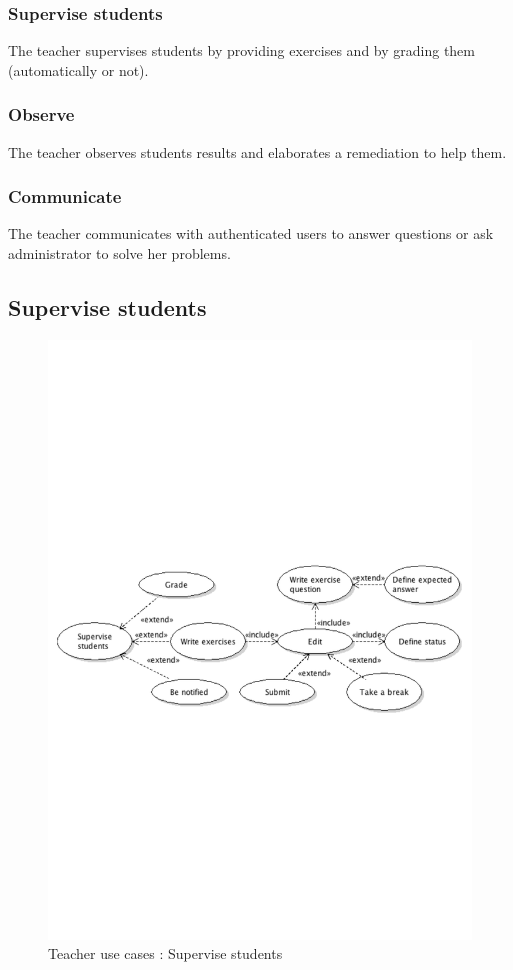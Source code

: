 		\subsubsection{Supervise students}
			The teacher supervises students by providing exercises and by grading them (automatically or not).
		\subsubsection{Observe}
			The teacher observes students results and elaborates a remediation to help them.
		\subsubsection{Communicate}
			The teacher communicates with authenticated users to answer questions or ask administrator to solve her problems.
\newpage
	\subsection{Supervise students}
		\begin{figure}[ht]
			\begin{center}
				\includegraphics[width=\textwidth,  trim=2cm 10cm 2cm 10cm]{UML_figure/use_cases/teacher/UC_Teacher_Supervise.pdf}
				\caption{Teacher use cases : Supervise students}
			\end{center}
		\end{figure}
